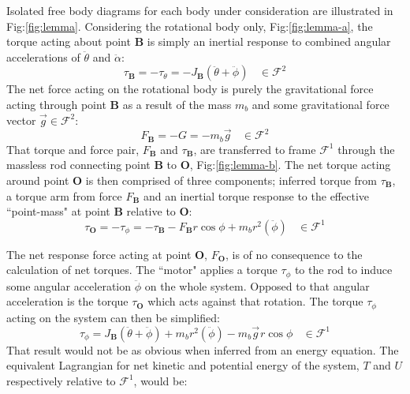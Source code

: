 \par
Isolated free body diagrams for each body under consideration are illustrated in Fig:\ref{fig:lemma}. Considering the rotational body only, Fig:\ref{fig:lemma-a}, the torque acting about point $\mathbf{B}$ is simply an inertial response to combined angular accelerations of $\ddot{\theta}$ and $\ddot{\alpha}$:
\begin{equation}
\tau_\mathbf{B}=-\tau_\theta=-J_\mathbf{B}(\ddot{\theta}+\ddot{\phi})~~~~\in\mathcal{F}^2
\end{equation}
The net force acting on the rotational body is purely the gravitational force acting through point $\mathbf{B}$ as a result of the mass $m_b$ and some gravitational force vector $\vec{g}\in\mathcal{F}^2$:
\begin{equation}
F_\mathbf{B}=-G=-m_b\vec{g}~~~~\in\mathcal{F}^2
\end{equation}
That torque and force pair, $F_\mathbf{B}$ and $\tau_\mathbf{B}$, are transferred to frame $\mathcal{F}^1$ through the massless rod connecting point $\mathbf{B}$ to $\mathbf{O}$, Fig:\ref{fig:lemma-b}. The net torque acting around point $\mathbf{O}$ is then comprised of three components; inferred torque from $\tau_\mathbf{B}$, a torque arm from force $F_\mathbf{B}$ and an inertial torque response to the effective ``point-mass" at point $\mathbf{B}$ relative to $\mathbf{O}$:
\begin{equation}
\tau_\mathbf{O}=-\tau_\phi=-\tau_\mathbf{B}-F_\mathbf{B}r\cos{\phi}+m_br^2(\ddot{\phi})~~~~\in\mathcal{F}^1
\end{equation}
\par
The net response force acting at point $\mathbf{O}$, $F_\mathbf{O}$, is of no consequence to the calculation of net torques. The ``motor" applies a torque $\tau_\phi$ to the rod to induce some angular acceleration $\ddot{\phi}$ on the whole system. Opposed to that angular acceleration is the torque $\tau_\mathbf{O}$ which acts against that rotation. The torque $\tau_\phi$ acting on the system can then be simplified:
\begin{equation}
\tau_\phi=J_\mathbf{B}(\ddot{\theta}+\ddot{\phi})+m_br^2(\ddot{\phi})-m_b\vec{g}\hspace{1pt}r\cos\phi~~~~\in\mathcal{F}^1
\end{equation}
That result would not be as obvious when inferred from an energy equation. The equivalent Lagrangian for net kinetic and potential energy of the system, $T$ and $U$ respectively relative to $\mathcal{F}^1$, would be:
